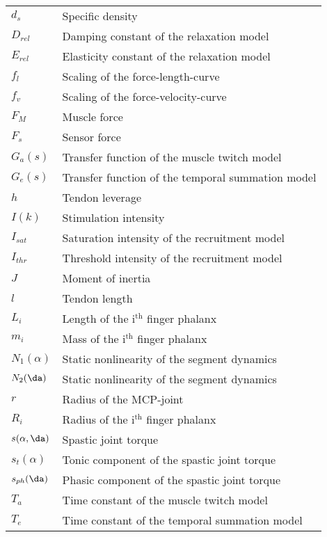 \begin{longtable}[l]{ll}
$d_s$										& Specific density\\
$D_{rel}$								& Damping constant of the relaxation model\\
$E_{rel}$								& Elasticity constant of the relaxation model\\
$f_l$										& Scaling of the force-length-curve\\
$f_v$										& Scaling of the force-velocity-curve\\
$F_M$										& Muscle force\\
$F_s$										& Sensor force\\
$G_a(s)$								& Transfer function of the muscle twitch model\\
$G_e(s)$								& Transfer function of the temporal summation model\\
$h$											& Tendon leverage\\
$I(k)$									& Stimulation intensity\\
$I_{sat}$								& Saturation intensity of the recruitment model\\
$I_{thr}$								& Threshold intensity of the recruitment model\\
$J$											& Moment of inertia\\
$l$											& Tendon length\\
$L_i$										& Length of the i$^{\text{th}}$ finger phalanx\\
$m_i$										& Mass of the i$^{\text{th}}$ finger phalanx\\
$N_1(\alpha)$						& Static nonlinearity of the segment dynamics\\
$N_2(\da)$						& Static nonlinearity of the segment dynamics\\
$r$											& Radius of the MCP-joint\\
$R_i$										& Radius of the i$^{\text{th}}$ finger phalanx\\
$s(\alpha,\da)$				  & Spastic joint torque\\
$s_t(\alpha)$						& Tonic component of the spastic joint torque\\
$s_{ph}(\da)$						& Phasic component of the spastic joint torque\\
$T_a$										& Time constant of the muscle twitch model\\
$T_e$										& Time constant of the temporal summation model\\

\end{longtable}
